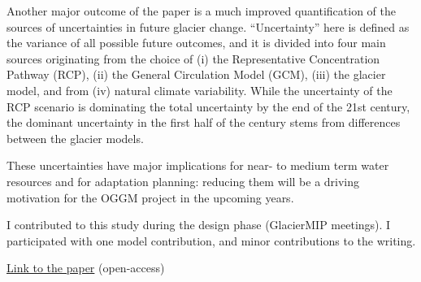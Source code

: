 Another major outcome of the paper is a much improved quantification of the sources of uncertainties
in future glacier change. “Uncertainty” here is defined as the variance of all possible future outcomes, and it is
divided into four main sources originating from the choice of (i) the Representative Concentration Pathway (RCP),
(ii) the General Circulation Model (GCM), (iii) the glacier model, and from (iv) natural climate variability.
While the uncertainty of the RCP scenario is dominating the total uncertainty by the end of the 21st century,
the dominant uncertainty in the first half of the century stems from differences between the glacier models.

These uncertainties have major implications for near- to medium term water resources and for adaptation planning:
reducing them will be a driving motivation for the OGGM project in the upcoming years.

I contributed to this study during the design phase (GlacierMIP meetings). I participated with one model contribution,
and minor contributions to the writing.

\href{https://doi.org/10.1029/2019ef001470}{Link to the paper} (open-access)

\iflong  \else \fi 


